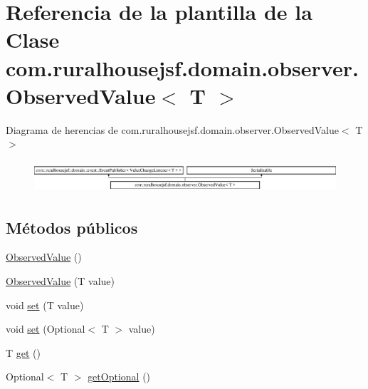 \hypertarget{classcom_1_1ruralhousejsf_1_1domain_1_1observer_1_1_observed_value}{}\section{Referencia de la plantilla de la Clase com.\+ruralhousejsf.\+domain.\+observer.\+Observed\+Value$<$ T $>$}
\label{classcom_1_1ruralhousejsf_1_1domain_1_1observer_1_1_observed_value}
Diagrama de herencias de com.\+ruralhousejsf.\+domain.\+observer.\+Observed\+Value$<$ T $>$\begin{figure}[H]
\begin{center}
\leavevmode
\includegraphics[height=1.181435cm]{classcom_1_1ruralhousejsf_1_1domain_1_1observer_1_1_observed_value}
\end{center}
\end{figure}
\subsection*{Métodos públicos}
\begin{DoxyCompactItemize}
\item 
\mbox{\hyperlink{classcom_1_1ruralhousejsf_1_1domain_1_1observer_1_1_observed_value_a3e9d0c3cf901dfdc6c5d919021d9b8ed}{Observed\+Value}} ()
\item 
\mbox{\hyperlink{classcom_1_1ruralhousejsf_1_1domain_1_1observer_1_1_observed_value_a428dfb79e0d2f9946e9361d8674b070b}{Observed\+Value}} (T value)
\item 
void \mbox{\hyperlink{classcom_1_1ruralhousejsf_1_1domain_1_1observer_1_1_observed_value_a7397923ac9ae07a242775665542dee80}{set}} (T value)
\item 
void \mbox{\hyperlink{classcom_1_1ruralhousejsf_1_1domain_1_1observer_1_1_observed_value_aaa277755e533e7e85e11640fc98866af}{set}} (Optional$<$ T $>$ value)
\item 
T \mbox{\hyperlink{classcom_1_1ruralhousejsf_1_1domain_1_1observer_1_1_observed_value_a6e489c75f998a9668e284a6df19d1184}{get}} ()
\item 
Optional$<$ T $>$ \mbox{\hyperlink{classcom_1_1ruralhousejsf_1_1domain_1_1observer_1_1_observed_value_a907b308692e368ef1021835f556ddc82}{get\+Optional}} ()
\end{DoxyCompactItemize}
